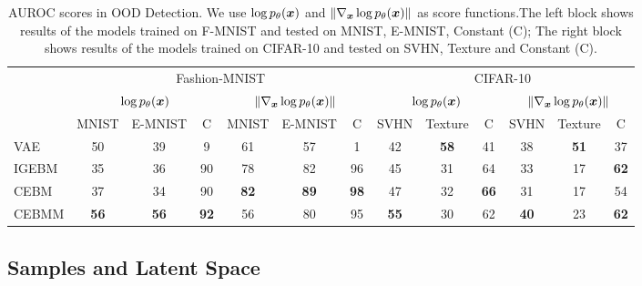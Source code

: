 \documentclass[tablecaption=bottom,wcp]{jmlr} %
\begin{document}
\setlength{\tabcolsep}{4pt}
\begin{table}[!h]
\scriptsize
\centering
\begin{tabular}{l|ccc|ccc||ccc|ccc}
\toprule
& \multicolumn{6}{c||}{Fashion-MNIST} &    \multicolumn{6}{c}{CIFAR-10}\\
& \multicolumn{3}{c|}{$\log p_{\theta}(\boldsymbol{x})$} & \multicolumn{3}{c||}{$\| \nabla_{\boldsymbol{x}}\log p_{\theta}(\boldsymbol{x})\|$} &  \multicolumn{3}{c|}{$\log p_{\theta}(\boldsymbol{x})$} & \multicolumn{3}{c}{$\| \nabla_{\boldsymbol{x}}\log p_{\theta}(\boldsymbol{x})\|$}\\
\midrule
            &  MNIST  & E-MNIST& C &  MNIST & E-MNIST & C &  SVHN & Texture & C &  SVHN & Texture & C \\
\midrule
VAE         & 50 & 39 & 9 & 61 & 57 & 1  & 42 & \textbf{58} & 41 & 38 & \textbf{51} & 37 \\
IGEBM       & 35 & 36 & 90 & 78 & 82 & 96& 45 & 31 & 64 & 33 & 17 & \textbf{62} \\
CEBM        & 37 & 34 & 90 & \textbf{82} & \textbf{89} & \textbf{98} & 47 & 32 & \textbf{66} & 31 & 17 & 54 \\
CEBMM       & \textbf{56} & \textbf{56} & \textbf{92} & 56 & 80 & 95     & \textbf{55} & 30 & 62 & \textbf{40} & 23 & \textbf{62}  \\
\bottomrule
\end{tabular}
\caption{AUROC scores in OOD Detection. We use $\log p_{\theta}(\boldsymbol{x})$ and $\| \nabla_{\boldsymbol{x}}\log p_{\theta}(\boldsymbol{x})\|$ as score functions.The left block shows results of the models trained on F-MNIST and tested on MNIST, E-MNIST, Constant (C); The right block shows results of the models trained on CIFAR-10 and tested on SVHN, Texture and Constant (C).}
\label{tab:ood-detection}
\end{table}

\subsection{Samples and Latent Space}
\label{sec:exp:quality}
\end{document}

